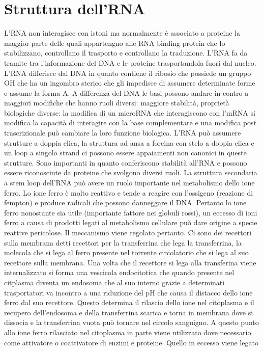 \section{Struttura dell'RNA}
L'RNA non interagisce con istoni ma normalmente \`e associato a proteine la maggior parte delle quali appartengno alle RNA binding protein che lo stabilizzano, controllano il trasporto
e controllano la traduzione. L'RNA fa da tramite tra l'informazione del DNA e le proteine trasportandola fuori dal nucleo. L'RNA differisce dal DNA in quanto contiene il ribosio che 
possiede un gruppo OH che ha un ingombro sterico che gli impedisce di assumere determinate forme e assume la forma A. A differenza del DNA le basi possono andare in contro a maggiori 
modifiche che hanno ruoli diversi: maggiore stabilit\`a, propriet\`a biologiche diverse: la modifica di un microRNA che interagiscono con l'mRNA si modifica la capacit\`a di interagire
con la base complementare e una modifica post trascrizionale pu\`o cambiare la loro funzione biologica. L'RNA pu\`o assumere strutture a doppia elica, la struttura ad ansa a forcina con 
stelo a doppia elica e un loop a singolo strand ci possono essere appaiamenti non canonici in queste strutture. Sono importanti in quanto conferiscono stabilit\`a all'RNA e possono essere
riconosciute da proteine che svolgono diversi ruoli. La struttura secondaria a stem loop dell'RNA pu\`o avere un ruolo importante nel metabolismo dello ione ferro. Lo ione ferro \`e 
molto reattivo e tende a reagire con l'ossigeno (reazione di fempton) e produce radicali che possono danneggare il DNA. Pertanto lo ione ferro nonostante sia utile (importante fattore
nei globuli rossi), un eccesso di ioni ferro a causa di prodotti legati al metabolismo cellulare pu\`o dare origine a specie reattive pericolose. Il meccanismo viene regolato pertanto. 
Ci sono dei recettori sulla membrana detti recettori per la transferrina che lega la transferrina, la molecola che si lega al ferro presente nel torrente circolatorio che si lega al
suo recettore sulla membrana. Una volta che il recettore si lega alla transferina viene internalizzato si forma una vescicola endocitotica che quando presente nel citplasma diventa un
endosoma che al suo interno grazie a determinati trasportatori va incontro a una riduzione del pH che causa il distacco dello ione ferro dal suo recettore. Questo determina il rilascio
dello ione nel citoplasma e il recupero dell'endosoma e della transferrina scarica e torna in membrana dove si dissocia e la transferrina vuota pu\`o tornare nel circolo sanguigno. 
A questo punto allo ione ferro rilasciato nel citoplasma in parte viene utilizzato dove necessario come attivatore o coattivatore di enzimi e proteine. Quello in eccesso viene legato 
